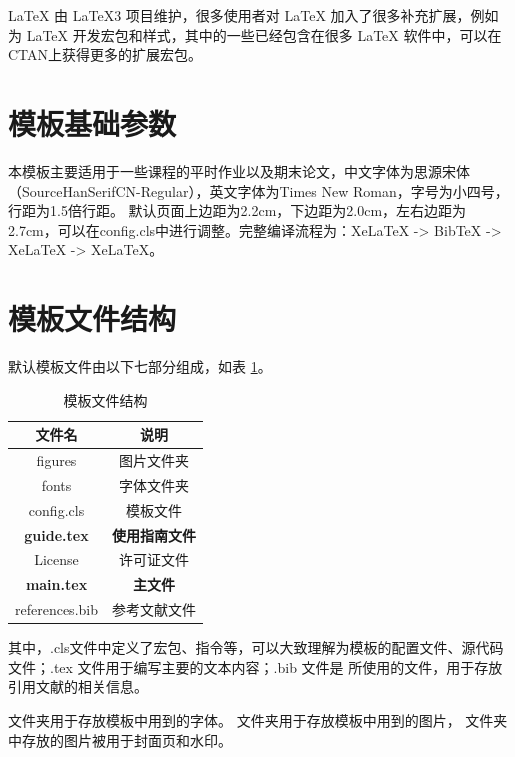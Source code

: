 \documentclass[
    report,     %
    oneside,    %
    UTF8,       %
    zihao=-4    %
]{config} %
\begin{document}
\LaTeX{} 由 \LaTeX{3} 项目维护，很多使用者对 \LaTeX{} 加入了很多补充扩展，例如为 \LaTeX{} 开发宏包和样式，其中的一些已经包含在很多 \LaTeX{} 软件中，可以在CTAN上获得更多的扩展宏包。


\section{模板基础参数}

本模板主要适用于一些课程的平时作业以及期末论文，中文字体为思源宋体（SourceHanSerifCN-Regular），英文字体为Times New Roman，字号为小四号，行距为1.5倍行距。 默认页面上边距为2.2cm，下边距为2.0cm，左右边距为2.7cm，可以在config.cls中进行调整。完整编译流程为：XeLaTeX -> BibTeX -> XeLaTeX -> XeLaTeX。


\section{模板文件结构}

默认模板文件由以下七部分组成，如表 \ref{tab:文件结构}。

\begin{table}[H]
  \centering
  \caption{模板文件结构}
  \label{tab:文件结构}
  \renewcommand\arraystretch{0.85} %
  \setlength{\tabcolsep}{15pt} %
  \begin{tabular}{cc}
    \toprule[1.5pt]
    \textbf{文件名}           & \textbf{说明}\\
    \midrule[0.75pt]
    figures                  & 图片文件夹\\
    fonts                    & 字体文件夹\\
    config.cls               & 模板文件\\
    \textbf{guide.tex}       & \textbf{使用指南文件}\\
    License                  & 许可证文件\\
    \textbf{main.tex}        & \textbf{主文件}\\
    references.bib           & 参考文献文件\\
    \bottomrule[1.5pt]
  \end{tabular}
\end{table}
\vspace{-0.6em}  %

其中，.cls文件中定义了宏包、指令等，可以大致理解为模板的配置文件、源代码文件；.tex 文件用于编写主要的文本内容；.bib 文件是  所使用的文件，用于存放引用文献的相关信息。

 文件夹用于存放模板中用到的字体。 文件夹用于存放模板中用到的图片， 文件夹中存放的图片被用于封面页和水印。
\end{document}
